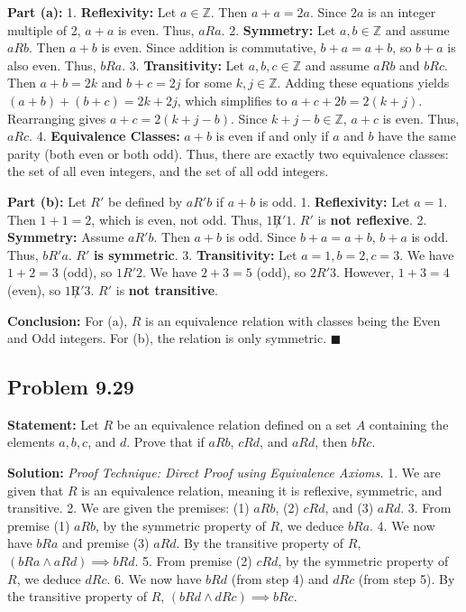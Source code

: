 \documentclass[11pt, a4paper]{article}
\theoremstyle{definition}
\theoremstyle{remark}
\newcommand{\Z}{\mathbb{Z}}
\begin{document}
\textbf{Part (a):}
1. \textbf{Reflexivity:} Let $a \in \Z$. Then $a + a = 2a$. Since $2a$ is an integer multiple of 2, $a + a$ is even. Thus, $a R a$.
2. \textbf{Symmetry:} Let $a, b \in \Z$ and assume $a R b$. Then $a + b$ is even. Since addition is commutative, $b + a = a + b$, so $b + a$ is also even. Thus, $b R a$.
3. \textbf{Transitivity:} Let $a, b, c \in \Z$ and assume $a R b$ and $b R c$. Then $a + b = 2k$ and $b + c = 2j$ for some $k, j \in \Z$. Adding these equations yields $(a + b) + (b + c) = 2k + 2j$, which simplifies to $a + c + 2b = 2(k + j)$. Rearranging gives $a + c = 2(k + j - b)$. Since $k + j - b \in \Z$, $a + c$ is even. Thus, $a R c$.
4. \textbf{Equivalence Classes:} $a + b$ is even if and only if $a$ and $b$ have the same parity (both even or both odd). Thus, there are exactly two equivalence classes: the set of all even integers, and the set of all odd integers.

\textbf{Part (b):} Let $R'$ be defined by $a R' b$ if $a + b$ is odd.
1. \textbf{Reflexivity:} Let $a = 1$. Then $1 + 1 = 2$, which is even, not odd. Thus, $1 \not R' 1$. $R'$ is \textbf{not reflexive}.
2. \textbf{Symmetry:} Assume $a R' b$. Then $a + b$ is odd. Since $b + a = a + b$, $b + a$ is odd. Thus, $b R' a$. $R'$ \textbf{is symmetric}.
3. \textbf{Transitivity:} Let $a = 1, b = 2, c = 3$. We have $1 + 2 = 3$ (odd), so $1 R' 2$. We have $2 + 3 = 5$ (odd), so $2 R' 3$. However, $1 + 3 = 4$ (even), so $1 \not R' 3$. $R'$ is \textbf{not transitive}.

\textbf{Conclusion:} For (a), $R$ is an equivalence relation with classes being the Even and Odd integers. For (b), the relation is only symmetric. $\blacksquare$

\subsection{Problem 9.29}
\textbf{Statement:} Let $R$ be an equivalence relation defined on a set $A$ containing the elements $a, b, c$, and $d$. Prove that if $a R b$, $c R d$, and $a R d$, then $b R c$.

\textbf{Solution:}
\textit{Proof Technique: Direct Proof using Equivalence Axioms.}
1. We are given that $R$ is an equivalence relation, meaning it is reflexive, symmetric, and transitive.
2. We are given the premises: (1) $a R b$, (2) $c R d$, and (3) $a R d$.
3. From premise (1) $a R b$, by the symmetric property of $R$, we deduce $b R a$.
4. We now have $b R a$ and premise (3) $a R d$. By the transitive property of $R$, $(b R a \land a R d) \implies b R d$.
5. From premise (2) $c R d$, by the symmetric property of $R$, we deduce $d R c$.
6. We now have $b R d$ (from step 4) and $d R c$ (from step 5). By the transitive property of $R$, $(b R d \land d R c) \implies b R c$.
\end{document}
